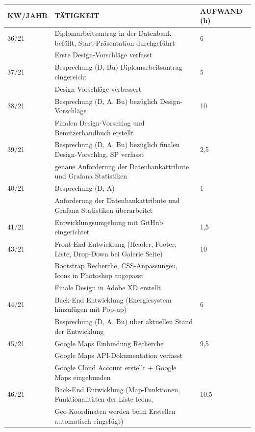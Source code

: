 \newpage
\begin{table}[h]
	\begin{tabular}{|l|l|l|}
		\hline
		\textbf{KW/JAHR} &     \textbf{TÄTIGKEIT}  & 	\textbf{AUFWAND (h)}    \\ \hline
		
36/21   & Diplomarbeitsantrag in der Datenbank befüllt, Start-Präsentation durchgeführt & 6 \\
		& Erste Design-Vorschläge verfasst & \\ \hline    
37/21   & Besprechung (D, Bu) Diplomarbeitsantrag eingereicht & 5 \\ 
		&  Design-Vorschläge verbessert &\\ \hline
38/21   & Besprechung (D, A, Bu) bezüglich Design-Vorschläge & 10 \\
		& Finalen Design-Vorschlag und Benutzerhandbuch erstellt &  \\ \hline	
39/21   & Besprechung (D, A, Bu) bezüglich finalen Design-Vorschlag, SP verfasst  & 2,5 \\
		& genaue Anforderung der Datenbankattribute und Grafana Statistiken  &  \\ \hline	
40/21   & Besprechung (D, A) & 1 \\
		& Anforderung der Datenbankattribute und Grafana Statistiken überarbeitet  &  \\ \hline	
41/21   & Entwicklungsumgebung mit GitHub eingerichtet   & 1,5	\\ \hline
43/21   & Front-End Entwicklung (Header, Footer, Liste, Drop-Down bei Galerie Seite) & 10 \\
		& Bootstrap Recherche, CSS-Anpassungen, Icons in Photoshop angepasst   &  \\ 
		& Finale Design in Adobe XD erstellt & \\ \hline	
44/21   & Back-End Entwicklung (Energiesystem hinzufügen mit Pop-up) & 6 \\
		& Besprechung (D, A, Bu) über aktuellen Stand der Entwicklung   &  \\ \hline	
45/21   & Google Maps Einbindung Recherche & 9,5 \\
		& Google Maps API-Dokumentation verfasst   &  \\ 
		& Google Cloud Account erstellt + Google Maps eingebunden & \\ \hline	
46/21   & Back-End Entwicklung (Map-Funktionen, Funktionalitäten der Liste Icons, & 10,5 \\
		& Geo-Koordinaten werden beim Erstellen automatisch eingefügt)  &  \\ 

\end{tabular}
\end{table}
